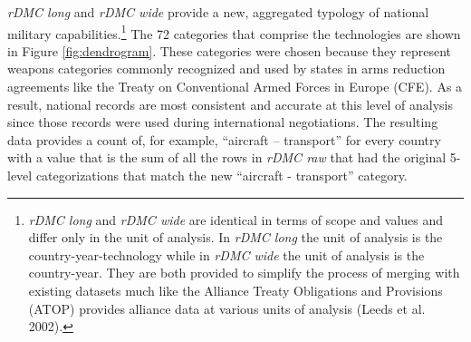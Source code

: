 \documentclass[
]{article}
\begin{document}
\emph{rDMC long} and \emph{rDMC wide} provide a new, aggregated typology of national military capabilities.\footnote{\emph{rDMC long} and \emph{rDMC wide} are identical in terms of scope and values and differ only in the unit of analysis. In \emph{rDMC long} the unit of analysis is the country-year-technology while in \emph{rDMC wide} the unit of analysis is the country-year. They are both provided to simplify the process of merging with existing datasets much like the Alliance Treaty Obligations and Provisions (ATOP) provides alliance data at various units of analysis (Leeds et al. 2002).} The 72 categories that comprise the technologies are shown in Figure \ref{fig:dendrogram}. These categories were chosen because they represent weapons categories commonly recognized and used by states in arms reduction agreements like the Treaty on Conventional Armed Forces in Europe (CFE). As a result, national records are most consistent and accurate at this level of analysis since those records were used during international negotiations. The resulting data provides a count of, for example, ``aircraft -- transport'' for every country with a value that is the sum of all the rows in \emph{rDMC raw} that had the original 5-level categorizations that match the new ``aircraft - transport'' category.
\end{document}

